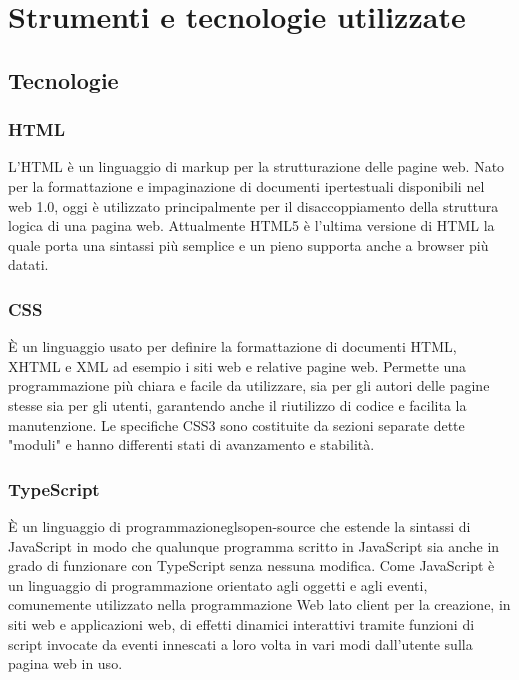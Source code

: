 \section{Strumenti e tecnologie utilizzate}

\subsection{Tecnologie}

\subsubsection*{HTML}
L'HTML è un \gls{linguaggio di markup}\ap{[g]} per la strutturazione delle pagine web. Nato per la formattazione e impaginazione di documenti ipertestuali disponibili nel web 1.0, oggi è utilizzato principalmente per il disaccoppiamento della struttura logica di una pagina web. Attualmente HTML5 è l'ultima versione di HTML la quale porta una sintassi più semplice e un pieno supporta anche a browser più datati.

\subsubsection*{CSS}
È un linguaggio usato per definire la formattazione di documenti HTML, XHTML e XML ad esempio i siti web e relative pagine web. Permette una programmazione più chiara e facile da utilizzare, sia per gli autori delle pagine stesse sia per gli utenti, garantendo anche il riutilizzo di codice e facilita la manutenzione. Le specifiche CSS3 sono costituite da sezioni separate dette "moduli" e hanno differenti stati di avanzamento e stabilità.

\subsubsection*{TypeScript}
È un linguaggio di programmazionegls{open-source}\ap{[g]} che estende la sintassi di JavaScript in modo che qualunque programma scritto in JavaScript sia anche in grado di funzionare con TypeScript senza nessuna modifica. Come JavaScript è un linguaggio di programmazione orientato agli oggetti e agli eventi, comunemente utilizzato nella programmazione Web lato \gls{client}\ap{[g]} per la creazione, in siti web e applicazioni web, di effetti dinamici interattivi tramite funzioni di script invocate da eventi innescati a loro volta in vari modi dall'utente sulla pagina web in uso.

